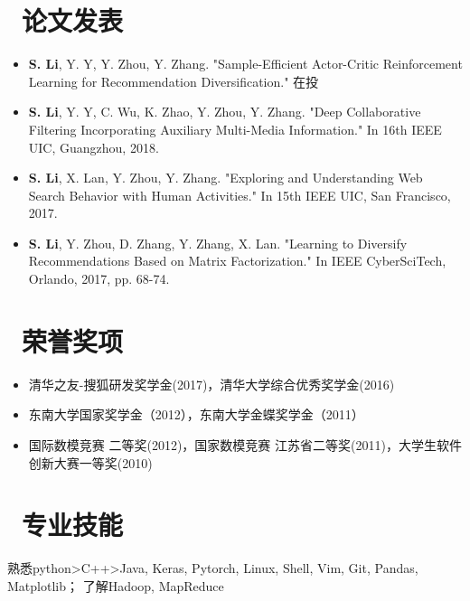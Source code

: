 \documentclass{resume}
\begin{document}
\section{\faBook\ 论文发表}
\begin{itemize}
	\item \textbf{S. Li}, Y. Y, Y. Zhou, Y. Zhang. "Sample-Efficient Actor-Critic Reinforcement Learning for Recommendation Diversification." 在投
	\item \textbf{S. Li}, Y. Y, C. Wu, K. Zhao, Y. Zhou, Y. Zhang. "Deep Collaborative Filtering Incorporating Auxiliary Multi-Media Information." In 16th IEEE UIC, Guangzhou, 2018.
	\item \textbf{S. Li}, X. Lan, Y. Zhou, Y. Zhang. "Exploring and Understanding Web Search Behavior with Human Activities." In 15th IEEE UIC, San Francisco, 2017.
	\item \textbf{S. Li}, Y. Zhou, D. Zhang, Y. Zhang, X. Lan. "Learning to Diversify Recommendations Based on Matrix Factorization." In IEEE CyberSciTech, Orlando, 2017, pp. 68-74.
\end{itemize}

\section{\faTrophy\ 荣誉奖项}
\begin{itemize}[parsep=0.5ex]
	\item 清华之友-搜狐研发奖学金(2017)，清华大学综合优秀奖学金(2016) 
	\item 东南大学国家奖学金（2012），东南大学金蝶奖学金（2011）
	\item 国际数模竞赛 二等奖(2012)，国家数模竞赛 江苏省二等奖(2011)，大学生软件创新大赛一等奖(2010)
\end{itemize}

\section{\faCogs\ 专业技能}
熟悉python>C++>Java, Keras, Pytorch, Linux, Shell, Vim, Git, Pandas, Matplotlib； 了解Hadoop, MapReduce
\end{document}
